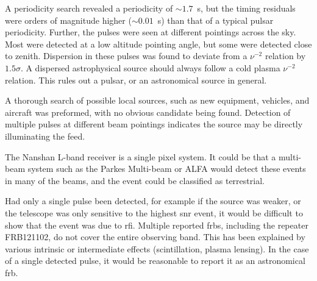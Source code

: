\documentclass[a4paper,fleqn,usenatbib]{mnras}
\begin{document}
A periodicity search revealed a periodicity of $\sim 1.7$~s, but the timing
residuals were orders of magnitude higher ($\sim 0.01$~s) than that of a typical
pulsar periodicity. Further, the pulses were seen at different pointings across
the sky.  Most were detected at a low altitude pointing angle, but some were
detected close to zenith.  Dispersion in these pulses was found to deviate from
a $\nu^{-2}$ relation by $1.5 \sigma$. A dispersed astrophysical source should
always follow a cold plasma $\nu^{-2}$ relation.
This rules out a pulsar, or an astronomical source in general.

%

A thorough search of possible local sources, such as new equipment, vehicles,
and aircraft was preformed, with no obvious candidate being found. Detection of
multiple pulses at different beam pointings indicates the source may be directly
illuminating the feed.

The Nanshan L-band receiver is a single pixel system. It could be that a
multi-beam system such as the Parkes Multi-beam or ALFA would detect these
events in many of the beams, and the event could be classified as terrestrial.

Had only a single pulse been detected, for example if the source was weaker, or
the telescope was only sensitive to the highest \gls{snr} event, it would be
difficult to show that the event was due to \gls{rfi}.  Multiple reported
\glspl{frb}, including the repeater FRB121102, do not cover the entire observing
band. This has been explained by various intrinsic or intermediate effects
(scintillation, plasma lensing). In the case of a single detected pulse, it would
be reasonable to report it as an astronomical \gls{frb}.
\end{document}
